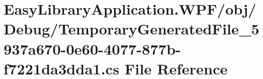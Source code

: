 \hypertarget{_easy_library_application_8_w_p_f_2obj_2_debug_2_temporary_generated_file__5937a670-0e60-4077-877b-f7221da3dda1_8cs}{}\section{Easy\+Library\+Application.\+W\+PF/obj/\+Debug/\+Temporary\+Generated\+File\+\_\+5937a670-\/0e60-\/4077-\/877b-\/f7221da3dda1.cs File Reference}
\label{_easy_library_application_8_w_p_f_2obj_2_debug_2_temporary_generated_file__5937a670-0e60-4077-877b-f7221da3dda1_8cs}
